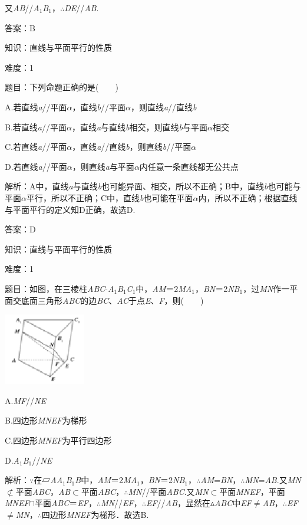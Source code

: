 \documentclass{article} %
\begin{document}
又\textit{AB}//\textit{A}${}_{1}$\textit{B}${}_{1}$，$\mathrm{\therefore}$\textit{DE}//\textit{AB}.

答案：B

知识：直线与平面平行的性质

难度：1

题目：下列命题正确的是(　　)

A.若直线\textit{a}//平面\textit{$\alpha$}，直线\textit{b}//平面\textit{$\alpha$}，则直线\textit{a}//直线\textit{b}

B.若直线\textit{a}//平面\textit{$\alpha$}，直线\textit{a}与直线\textit{b}相交，则直线\textit{b}与平面\textit{$\alpha$}相交

C.若直线\textit{a}//平面\textit{$\alpha$}，直线\textit{a}//直线\textit{b}，则直线\textit{b}//平面\textit{$\alpha$}

D.若直线\textit{a}//平面\textit{$\alpha$}，则直线\textit{a}与平面\textit{$\alpha$}内任意一条直线都无公共点

解析：A中，直线\textit{a}与直线\textit{b}也可能异面、相交，所以不正确；B中，直线\textit{b}也可能与平面\textit{$\alpha$}平行，所以不正确；C中，直线\textit{b}也可能在平面\textit{$\alpha$}内，所以不正确；根据直线与平面平行的定义知D正确，故选D.

答案：D

知识：直线与平面平行的性质

难度：1

题目：如图，在三棱柱\textit{ABC}-\textit{A}${}_{1}$\textit{B}${}_{1}$\textit{C}${}_{1}$中，\textit{AM}＝2\textit{MA}${}_{1}$，\textit{BN}＝2\textit{NB}${}_{1}$，过\textit{MN}作一平面交底面三角形\textit{ABC}的边\textit{BC}、\textit{AC}于点\textit{E}、\textit{F}，则(　　)

\includegraphics*[width=1.42in, height=1.23in, keepaspectratio=false]{image161}

A.\textit{MF}//\textit{NE}

B.四边形\textit{MNEF}为梯形

C.四边形\textit{MNEF}为平行四边形

D.\textit{A}${}_{1}$\textit{B}${}_{1}$//\textit{NE}

解析：$\mathrm{\because}$在▱\textit{AA}${}_{1}$\textit{B}${}_{1}$\textit{B}中，\textit{AM}＝2\textit{MA}${}_{1}$，\textit{BN}＝2\textit{NB}${}_{1}$，$\mathrm{\therefore}$\textit{AM}=\textit{BN}，$\mathrm{\therefore}$\textit{MN}=\textit{AB}.又\textit{MN}$\mathrm{\nsubset}$平面\textit{ABC}，\textit{AB}$\mathrm{\subset }$平面\textit{ABC}，$\mathrm{\therefore}$\textit{MN}//平面\textit{ABC}.又\textit{MN}$\mathrm{\subset }$平面\textit{MNEF}，平面\textit{MNEF}$\mathrm{\cap}$平面\textit{ABC}＝\textit{EF}，$\mathrm{\therefore}$\textit{MN}//\textit{EF}，$\mathrm{\therefore}$\textit{EF}//\textit{AB}，显然在$\mathrm{\vartriangle}$\textit{ABC}中\textit{EF}$\mathrm{\neq}$\textit{AB}，$\mathrm{\therefore}$\textit{EF}$\mathrm{\neq}$\textit{MN}，$\mathrm{\therefore}$四边形\textit{MNEF}为梯形．故选B.
\end{document}
